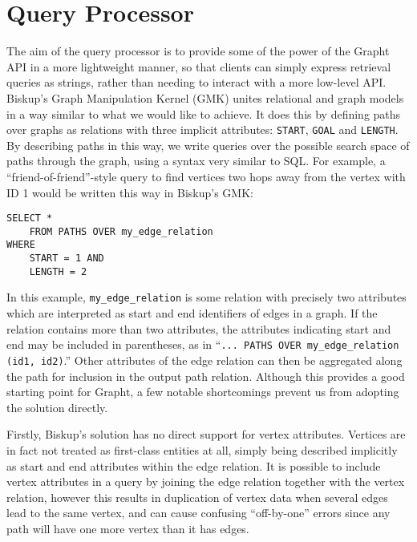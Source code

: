\section{Query Processor}

The aim of the query processor is to provide some of the power of the Grapht
API in a more lightweight manner, so that clients can simply express retrieval
queries as strings, rather than needing to interact with a more low-level API.
Biskup's Graph Manipulation Kernel\cite{gSQL} (GMK) unites relational and
graph models in a way similar to what we would like to achieve. It does this
by defining paths over graphs as relations with three implicit attributes:
\texttt{START}, \texttt{GOAL} and \texttt{LENGTH}.  By describing paths in
this way, we write queries over the possible search space of paths through
the graph, using a syntax very similar to SQL. For example, a ``friend-of-friend''-style query to find vertices two hops away from the vertex with
ID 1 would be written this way in Biskup's GMK:

\begin{verbatim}
SELECT *
    FROM PATHS OVER my_edge_relation
WHERE 
    START = 1 AND 
    LENGTH = 2 
\end{verbatim}

In this example, \texttt{my\_edge\_relation} is some relation with precisely two
attributes which are interpreted as start and end identifiers of edges in a
graph. If the relation contains more than two attributes, the attributes
indicating start and end may be included in parentheses, as in ``\texttt{...
PATHS OVER my\_edge\_relation (id1, id2)}.'' Other attributes of the edge
relation can then be aggregated along the path for inclusion in
the output path relation.  Although this provides a good starting
point for Grapht, a few notable shortcomings prevent us from adopting the
solution directly.

Firstly, Biskup's solution has no direct support for vertex attributes.
Vertices are in fact not treated as first-class entities at all, simply being
described implicitly as start and end attributes within the edge relation. It
is possible to include vertex attributes in a query by joining the edge
relation together with the vertex relation, however this results in
duplication of vertex data when several edges lead to the same vertex, and can
cause confusing ``off-by-one'' errors since any path will have one more vertex
than it has edges.

